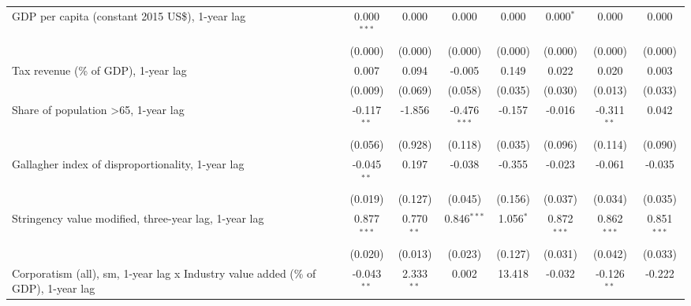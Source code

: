 \begin{table}[htbp]
\begin{tabular}{lccccccc}
      GDP per capita (constant 2015 US\$), 1-year lag                                   & 0.000$^{***}$ & 0.000                     & 0.000          & 0.000            & 0.000$^{*}$     & 0.000           & 0.000\\   
                                                                                        & (0.000)       & (0.000)                   & (0.000)        & (0.000)          & (0.000)         & (0.000)         & (0.000)\\   
      Tax revenue (\% of GDP), 1-year lag                                               & 0.007         & 0.094                     & -0.005         & 0.149            & 0.022           & 0.020           & 0.003\\   
                                                                                        & (0.009)       & (0.069)                   & (0.058)        & (0.035)          & (0.030)         & (0.013)         & (0.033)\\   
      Share of population >65, 1-year lag                                               & -0.117$^{**}$ & -1.856                    & -0.476$^{***}$ & -0.157           & -0.016          & -0.311$^{**}$   & 0.042\\   
                                                                                        & (0.056)       & (0.928)                   & (0.118)        & (0.035)          & (0.096)         & (0.114)         & (0.090)\\   
      Gallagher index of disproportionality, 1-year lag                                 & -0.045$^{**}$ & 0.197                     & -0.038         & -0.355           & -0.023          & -0.061          & -0.035\\   
                                                                                        & (0.019)       & (0.127)                   & (0.045)        & (0.156)          & (0.037)         & (0.034)         & (0.035)\\   
      Stringency value modified, three-year lag, 1-year lag                             & 0.877$^{***}$ & 0.770$^{**}$              & 0.846$^{***}$  & 1.056$^{*}$      & 0.872$^{***}$   & 0.862$^{***}$   & 0.851$^{***}$\\   
                                                                                        & (0.020)       & (0.013)                   & (0.023)        & (0.127)          & (0.031)         & (0.042)         & (0.033)\\   
      Corporatism (all), sm, 1-year lag x Industry value added (\% of GDP), 1-year lag  & -0.043$^{**}$ & 2.333$^{**}$              & 0.002          & 13.418           & -0.032          & -0.126$^{**}$   & -0.222\\   

\end{tabular}
\end{table}
